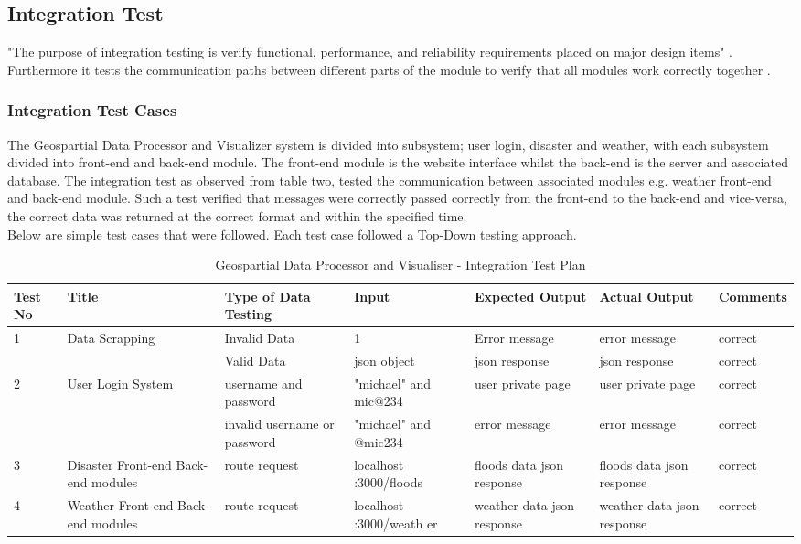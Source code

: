 \subsection{Integration Test}
"The purpose of integration testing is verify functional, performance, and reliability requirements placed on major design items" \cite{integrationTest2}. Furthermore it tests the communication paths between different parts of the module to verify that all modules work correctly together \cite{integrationTest}.

\subsubsection{Integration Test Cases}

The Geospartial Data Processor and Visualizer system is divided into subsystem; user login, disaster and weather, with each subsystem divided into front-end and back-end module. The front-end module is the website interface whilst the back-end is the server and associated database. The integration test as observed from table two, tested the communication between associated modules e.g. weather front-end and back-end module. Such a test verified that messages were correctly passed correctly from the front-end to the back-end and vice-versa, the correct data was returned at the correct format and within the specified time. \\

Below are simple test cases that were followed. Each test case followed a Top-Down testing approach. 


\begin{table}[h!]
\caption{Geospartial Data Processor and Visualiser - Integration Test Plan}
\begin{tabular}{| p{1 cm} | p{3 cm} | p{3 cm} | p{2 cm} | p{2 cm} | p{2 cm} | p{2 cm} |}
\hline
Test No & Title & Type of Data Testing & Input & Expected Output & Actual Output & Comments \\ [0.5ex]
\hline\hline
1 & Data Scrapping & Invalid Data & 1 & Error message & error message & correct\\
 &  & Valid Data & json object & json response & json response & correct\\
\hline
2 & User Login System & username and password & "michael" and mic@234 & user private page & user private page & correct\\
 &  & invalid username or password & "michael" and @mic234 & error message & error message & correct\\
\hline
3 & Disaster Front-end Back-end modules & route request & localhost :3000/floods & floods data json response & floods data json response & correct\\
\hline
4 & Weather Front-end Back-end modules & route request &  localhost :3000/weath er & weather data json response & weather data json response & correct\\ [1ex]
\hline
\end{tabular}
\end{table}

